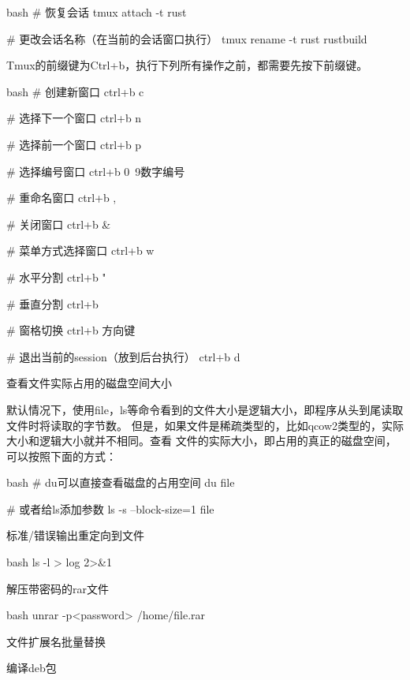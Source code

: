 \begin{outline}[enumerate]
\begin{code-block}{bash}
# 恢复会话
tmux attach -t rust

# 更改会话名称（在当前的会话窗口执行）
tmux rename -t rust rustbuild
\end{code-block}

Tmux的前缀键为Ctrl+b，执行下列所有操作之前，都需要先按下前缀键。
\begin{code-block}{bash}
# 创建新窗口
ctrl+b c

# 选择下一个窗口
ctrl+b n

# 选择前一个窗口
ctrl+b p

# 选择编号窗口
ctrl+b 0~9数字编号

# 重命名窗口
ctrl+b ,

# 关闭窗口
ctrl+b &

# 菜单方式选择窗口
ctrl+b w

# 水平分割
ctrl+b "

# 垂直分割
ctrl+b %

# 窗格切换
ctrl+b 方向键

# 退出当前的session（放到后台执行）
ctrl+b d
\end{code-block}

\1 查看文件实际占用的磁盘空间大小

默认情况下，使用file，ls等命令看到的文件大小是逻辑大小，即程序从头到尾读取文件时将读取的字节数。
但是，如果文件是稀疏类型的，比如qcow2类型的，实际大小和逻辑大小就并不相同。查看
文件的实际大小，即占用的真正的磁盘空间，可以按照下面的方式：
\begin{code-block}{bash}
# du可以直接查看磁盘的占用空间
du file

# 或者给ls添加参数
ls -s --block-size=1 file
\end{code-block}

\1 标准/错误输出重定向到文件

\begin{code-block}{bash}
ls -l > log 2>&1
\end{code-block}

\1 解压带密码的rar文件

\begin{code-block}{bash}
unrar -p<password> /home/file.rar
\end{code-block}

\1 文件扩展名批量替换


\1 编译deb包


\end{outline}
